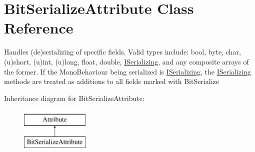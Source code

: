 \hypertarget{class_bit_serialize_attribute}{\section{Bit\-Serialize\-Attribute Class Reference}
\label{class_bit_serialize_attribute}
}


Handles (de)serializing of specific fields. Valid types include\-: bool, byte, char, (u)short, (u)int, (u)long, float, double, \hyperlink{interface_i_serializing}{I\-Serializing}, and any composite arrays of the former. If the Mono\-Behaviour being serialized is \hyperlink{interface_i_serializing}{I\-Serializing}, the \hyperlink{interface_i_serializing}{I\-Serializing} methods are treated as additions to all fields marked with Bit\-Serialize  


Inheritance diagram for Bit\-Serialize\-Attribute\-:\begin{figure}[H]
\begin{center}
\leavevmode
\includegraphics[height=2.000000cm]{class_bit_serialize_attribute}
\end{center}
\end{figure}
